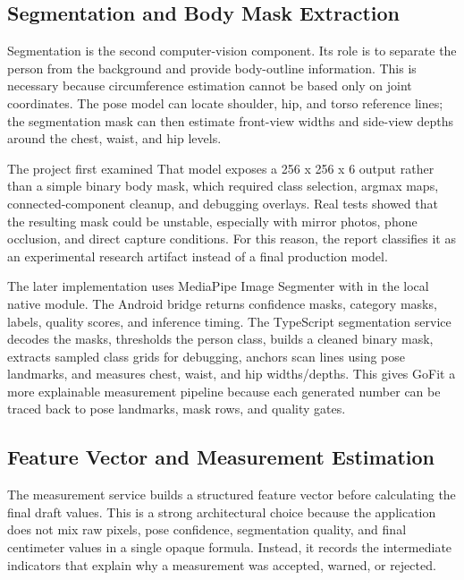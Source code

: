 \documentclass[12pt,a4paper,openany]{report}
\begin{document}
\subsection{Segmentation and Body Mask Extraction}

Segmentation is the second computer-vision component. Its role is to separate the person from the background and provide body-outline information. This is necessary because circumference estimation cannot be based only on joint coordinates. The pose model can locate shoulder, hip, and torso reference lines; the segmentation mask can then estimate front-view widths and side-view depths around the chest, waist, and hip levels.


The project first examined  That model exposes a 256 x 256 x 6 output rather than a simple binary body mask, which required class selection, argmax maps, connected-component cleanup, and debugging overlays. Real tests showed that the resulting mask could be unstable, especially with mirror photos, phone occlusion, and direct capture conditions. For this reason, the report classifies it as an experimental research artifact instead of a final production model.


The later implementation uses MediaPipe Image Segmenter with  in the local native module. The Android bridge returns confidence masks, category masks, labels, quality scores, and inference timing. The TypeScript segmentation service decodes the masks, thresholds the person class, builds a cleaned binary mask, extracts sampled class grids for debugging, anchors scan lines using pose landmarks, and measures chest, waist, and hip widths/depths. This gives GoFit a more explainable measurement pipeline because each generated number can be traced back to pose landmarks, mask rows, and quality gates.


\subsection{Feature Vector and Measurement Estimation}

The measurement service builds a structured feature vector before calculating the final draft values. This is a strong architectural choice because the application does not mix raw pixels, pose confidence, segmentation quality, and final centimeter values in a single opaque formula. Instead, it records the intermediate indicators that explain why a measurement was accepted, warned, or rejected.
\end{document}
